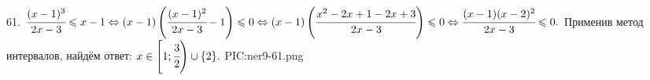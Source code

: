 61. $\cfrac{(x-1)^3}{2x-3}\leqslant x-1\Leftrightarrow (x-1)\left(\cfrac{(x-1)^2}{2x-3}-1\right)\leqslant0\Leftrightarrow
(x-1)\left(\cfrac{x^2-2x+1-2x+3}{2x-3}\right)\leqslant0\Leftrightarrow\cfrac{(x-1)(x-2)^2}{2x-3}\leqslant0.$ Применив метод интервалов, найдём ответ: $x\in\left[1;\cfrac{3}{2}\right)\cup\{2\}.$
{{PIC:ner9-61.png}}\\
